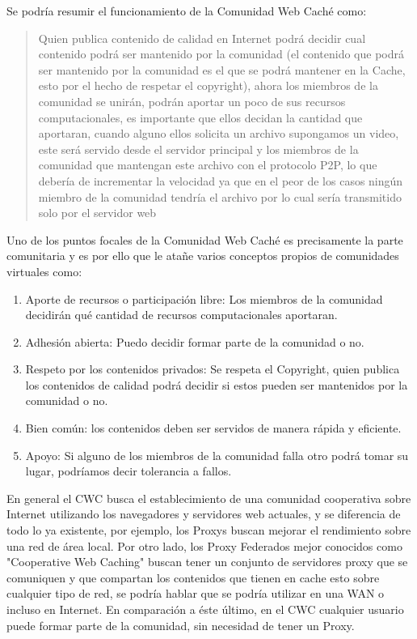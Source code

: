 Se podría resumir el funcionamiento de la Comunidad Web Caché como:
\begin{verse}
Quien publica contenido de calidad en Internet podrá decidir cual contenido podrá ser mantenido por la comunidad (el contenido que podrá ser mantenido por la comunidad es el que se podrá mantener en la Cache, esto por el hecho de respetar el copyright), ahora los miembros de la comunidad se unirán, podrán aportar un poco de sus recursos computacionales, es importante que ellos decidan la cantidad que aportaran, cuando alguno ellos solicita un archivo supongamos un video, este será servido desde el servidor principal y los miembros de la comunidad que mantengan este archivo con el protocolo P2P, lo que debería de incrementar la velocidad ya que en el peor de los casos ningún miembro de la comunidad tendría el archivo por lo cual sería transmitido solo por el servidor web
\end{verse}

Uno de los puntos focales de la Comunidad Web Caché es precisamente la parte comunitaria y es por ello que le atañe varios conceptos propios de comunidades virtuales como: 

\begin{enumerate}
\item Aporte de recursos o participación libre: Los miembros de la comunidad decidirán qué cantidad de recursos computacionales aportaran.
\item Adhesión abierta: Puedo decidir formar parte de la comunidad o no.
\item Respeto por los contenidos privados: Se respeta el Copyright, quien publica los contenidos de calidad podrá decidir si estos pueden ser mantenidos por la comunidad o no.
\item Bien común: los contenidos deben ser servidos de manera rápida y eficiente.
\item Apoyo: Si alguno de los miembros de la comunidad falla otro podrá tomar su lugar, podríamos decir tolerancia a fallos.
\end{enumerate}

En general el CWC busca el establecimiento de una comunidad cooperativa sobre Internet utilizando los navegadores y servidores web actuales, y se diferencia de todo lo ya existente, por ejemplo, los Proxys buscan mejorar el rendimiento sobre una red de área local. Por otro lado, los Proxy Federados mejor conocidos como "Cooperative Web Caching" buscan tener un conjunto de servidores proxy que se comuniquen y que compartan los contenidos que tienen en cache esto sobre cualquier tipo de red, se podría hablar que se podría utilizar en una WAN o incluso en Internet. En comparación a éste último, en el CWC cualquier usuario puede formar parte de la comunidad, sin necesidad de tener un Proxy.


